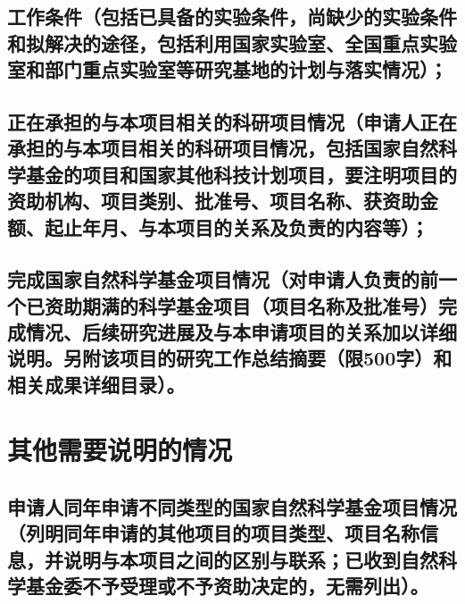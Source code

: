 \documentclass[UTF8, punct, oneside, fontset=none]{ctexbook}
\begin{document}
\begin{MS}
	
\end{MS}

\section{\textbf{工作条件}（包括已具备的实验条件，尚缺少的实验条件和拟解决的途径，包括利用国家实验室、全国重点实验室和部门重点实验室等研究基地的计划与落实情况）；}

\begin{MS}
	
\end{MS}

\section{\textbf{正在承担的与本项目相关的科研项目情况}（申请人正在承担的与本项目相关的科研项目情况，包括国家自然科学基金的项目和国家其他科技计划项目，要注明项目的资助机构、项目类别、批准号、项目名称、\hspace{-2pt}获资助金额、\hspace{-2pt}起止年月、\hspace{-2pt}与本项目的关系及负责的内容等）；}

\begin{MS}
	
\end{MS}

\section{\textbf{完成国家自然科学基金项目情况}（对申请人负责的前一个已资助期满的科学基金项目\kg{-0.1em}（项目名称及批准号）\kg{-0.1em}完成情况、\kg{-0.1em}后续研究进展及与本申请项目的关系加以详细说明。\kg{-0.1em}另附该项目的研究工作总结摘要（限500字）和相关成果详细目录）。}

\begin{MS}
	
\end{MS}

\chapter[-3.4pt]{\textbf{其他需要说明的情况}}
\section{申请人同年申请不同类型的国家自然科学基金项目情况（列明同年申请的其他项目的项目类型、项目名称信息，并说明与本项目之间的区别与联系；已收到自然科学基金委不予受理或不予资助决定的，无需列出）。}
\end{document}
